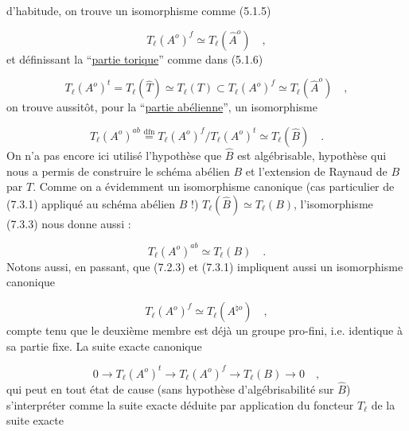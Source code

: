 
d'habitude, on trouve un isomorphisme comme (5.1.5)

\begin{equation}\tag{7.3.1}
T_{\ell}(A^{o})^{f} \simeq T_{\ell}(\hat{A}^{o}) \quad ,
\end{equation}
et définissant la ``\underline{partie torique}'' comme dans (5.1.6)

\begin{equation}\tag{7.3.2}
T_{\ell}(A^{o})^{t} = T_{\ell}(\hat{T}) \simeq T_{\ell}(T) \subset T_{\ell}(A^{o})^{f} \simeq T_{\ell}(\hat{A}^{o}) \quad ,
\end{equation}
on trouve aussitôt, pour la ``\underline{partie abélienne}'', un isomorphisme

\begin{equation}\tag{7.3.3}
T_{\ell}(A^{o})^{ab} \stackrel{\mathrm{dfn}}{=} T_{\ell}(A^{o})^{f}/T_{\ell}(A^{o})^{t} \simeq T_{\ell}(\hat{B}) \quad .
\end{equation}
On n'a pas encore ici utilisé l'hypothèse que $\hat{B}$ est algébrisable, hypothèse qui nous a permis de construire le schéma abélien $B$ et l'extension de Raynaud de $B$ par $T$. Comme on a évidemment un isomorphisme canonique (cas particulier de (7.3.1) appliqué au schéma abélien $B$ !) $T_{\ell}(\hat{B}) \simeq T_{\ell}(B)$, l'isomorphisme (7.3.3) nous donne aussi :

\begin{equation}\tag{7.3.4}
T_{\ell}(A^{o})^{ab} \simeq T_{\ell}(B) \quad .
\end{equation}
Notons aussi, en passant, que (7.2.3) et (7.3.1) impliquent aussi un isomorphisme canonique

\begin{equation}\tag{7.3.5}
T_{\ell}(A^{o})^{f} \simeq T_{\ell}(A^{\natural o}) \quad ,
\end{equation}
compte tenu que le deuxième membre est déjà un groupe pro-fini, i.e. identique à sa partie fixe. La suite exacte canonique

\begin{equation}\tag{7.3.6}
0 \longrightarrow T_{\ell}(A^{o})^{t} \longrightarrow T_{\ell}(A^{o})^{f} \longrightarrow T_{\ell}(B) \longrightarrow 0 \quad ,
\end{equation}
qui peut en tout état de cause (sans hypothèse d'algébrisabilité sur $\hat{B}$) s'interpréter comme la suite exacte déduite par application du foncteur $T_{\ell}$ de la suite exacte

